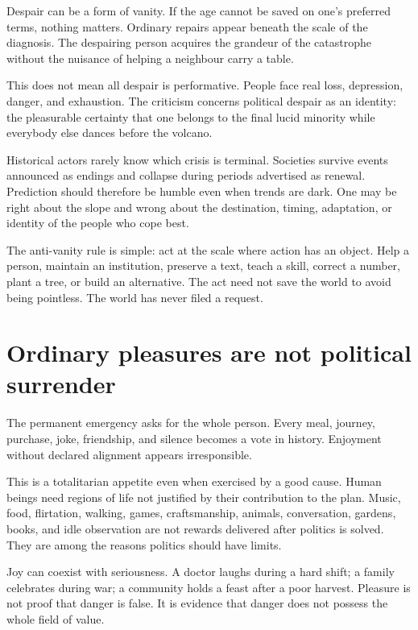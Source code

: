 \documentclass[12pt,a4paper]{book}
\begin{document}
Despair can be a form of vanity.  If the age cannot be saved on one's preferred
terms, nothing matters.  Ordinary repairs appear beneath the scale of the
diagnosis.  The despairing person acquires the grandeur of the catastrophe
without the nuisance of helping a neighbour carry a table.

This does not mean all despair is performative.  People face real loss,
depression, danger, and exhaustion.  The criticism concerns political despair
as an identity: the pleasurable certainty that one belongs to the final lucid
minority while everybody else dances before the volcano.

Historical actors rarely know which crisis is terminal.  Societies survive
events announced as endings and collapse during periods advertised as renewal.
Prediction should therefore be humble even when trends are dark.  One may be
right about the slope and wrong about the destination, timing, adaptation, or
identity of the people who cope best.

The anti-vanity rule is simple: act at the scale where action has an object.
Help a person, maintain an institution, preserve a text, teach a skill, correct
a number, plant a tree, or build an alternative.  The act need not save the
world to avoid being pointless.  The world has never filed a request.

\section{Ordinary pleasures are not political surrender}

The permanent emergency asks for the whole person.  Every meal, journey,
purchase, joke, friendship, and silence becomes a vote in history.  Enjoyment
without declared alignment appears irresponsible.

This is a totalitarian appetite even when exercised by a good cause.  Human
beings need regions of life not justified by their contribution to the plan.
Music, food, flirtation, walking, games, craftsmanship, animals, conversation,
gardens, books, and idle observation are not rewards delivered after politics
is solved.  They are among the reasons politics should have limits.

Joy can coexist with seriousness.  A doctor laughs during a hard shift; a
family celebrates during war; a community holds a feast after a poor harvest.
Pleasure is not proof that danger is false.  It is evidence that danger does
not possess the whole field of value.
\end{document}
